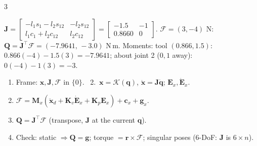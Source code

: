 \begin{multicols}{3}
\begin{wnfig}
{}\par
{}
\end{wnfig}
\begin{worked}[$\mathbf Q=\mathbf J^\top\mathcal F$: planar 2R, $l_1=l_2=1$, $\mathbf q=(30^\circ,60^\circ)$]
$\mathbf J=\begin{bmatrix}-l_1s_1-l_2s_{12}&-l_2s_{12}\\l_1c_1+l_2c_{12}&l_2c_{12}\end{bmatrix}=\begin{bmatrix}-1.5&-1\\0.8660&0\end{bmatrix}$. $\mathcal F=(3,-4)$ N: $\mathbf Q=\mathbf J^\top\mathcal F=(-7.9641,\,-3.0)$ N\,m. Moments: tool $(0.866,1.5)$: $0.866(-4)-1.5(3)=-7.9641$; about joint 2 ($0,1$ away): $0(-4)-1(3)=-3$. \chk
\end{worked}
\begin{recipe}
\begin{enumerate}
\item Frame: $\mathbf x,\mathbf J,\mathcal F$ in $\{0\}$. \ 2.\ $\mathbf x=\mathcal K(\mathbf q)$, $\dot{\mathbf x}=\mathbf J\dot{\mathbf q}$; $\mathbf E_x,\dot{\mathbf E}_x$.
\item $\mathcal F=\mathbf M_x(\ddot{\mathbf x}_d+\mathbf K_v\dot{\mathbf E}_x+\mathbf K_p\mathbf E_x)+\mathbf c_x+\mathbf g_x$.
\item $\mathbf Q=\mathbf J^\top\mathcal F$ (transpose, $\mathbf J$ at the current $\mathbf q$).
\item Check: static $\Rightarrow\mathbf Q=\mathbf g$; torque $=\mathbf r\times\mathcal F$; singular poses (6-DoF: $\mathbf J$ is $6\times n$).
\end{enumerate}
\end{recipe}


\end{multicols}
